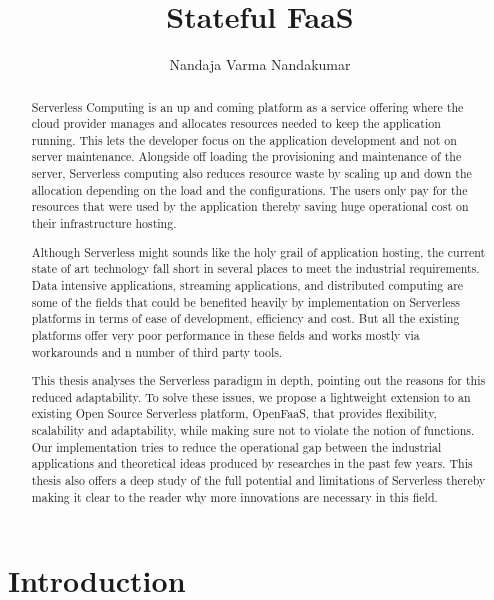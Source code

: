 \documentclass[12pt,titlepage]{article}
\author{Nandaja Varma Nandakumar}
\date{}
\title{Stateful FaaS}
\begin{document}
\maketitle
\begin{abstract}
Serverless Computing is an up and coming platform as a service offering 
where the cloud provider manages and allocates
resources needed to keep the application running. This lets the developer focus on the application development
and not on server maintenance. Alongside off loading the provisioning and
maintenance of the server, Serverless computing also reduces resource waste
by scaling up and down the allocation depending on the load and the
configurations. The users only pay for the resources that were used by the
application thereby saving huge operational cost on their infrastructure
hosting.

Although Serverless might sounds like the holy grail of application hosting, the 
current state of art technology fall short in several places to meet the industrial
requirements. Data intensive applications, streaming applications, and
distributed computing are some of the fields that could be benefited heavily by
implementation on Serverless platforms in terms of ease of development,
efficiency and cost. But all the existing platforms offer very
poor performance in these fields and works mostly via workarounds and n number
of third party tools.

This thesis analyses the Serverless paradigm in depth,
pointing out the reasons for this reduced adaptability. To solve these issues, we propose a lightweight
extension to an existing Open Source Serverless platform, OpenFaaS, that provides
flexibility, scalability and adaptability, while making sure not to violate the notion
of functions. Our implementation tries to reduce the operational gap between the
industrial applications and theoretical ideas produced by researches in the past few years.
This thesis also offers a deep study of the full potential and limitations of
Serverless thereby making it clear to the reader why more innovations are
necessary in this field.

\end{abstract}

\setcounter{tocdepth}{5}
\tableofcontents


\section{Introduction}
\label{sec:orgf44e85c}
\end{document}
